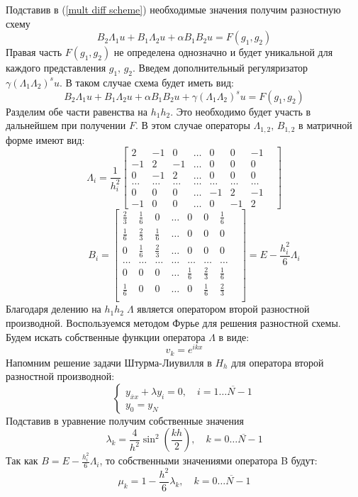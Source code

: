 \documentclass[oneside, final, 14pt]{article}
\begin{document}
Подставив в (\ref{mult diff scheme}) необходимые значения получим разностную схему
\begin{equation}
B_2 \Lambda_1 u + B_1 \Lambda_2 u + \alpha B_1 B_2 u = F(g_1,g_2)
\end{equation}
Правая часть $F(g_1,g_2)$ не определена однозначно и будет уникальной для каждого представления $g_1,\,g_2$.
Введем дополнительный регуляризатор $\gamma(\Lambda_1\Lambda_2)^s u$. В таком случае схема будет иметь вид:
\begin{equation}\label{scheme}
B_2 \Lambda_1 u + B_1 \Lambda_2 u + \alpha B_1 B_2 u +\gamma(\Lambda_1\Lambda_2)^s u = F(g_1,g_2)
\end{equation}
Разделим обе части равенства на $h_1h_2$. Это необходимо будет участь в дальнейшем при получении $F$.
В этом случае операторы $\Lambda_{1,2},\,B_{1,2}$ в матричной форме имеют вид:
$$\Lambda_i = \frac{1}{h_i^2}
\begin{bmatrix}
2 & -1 & 0 & \ldots & 0 & 0 & -1\\
-1 & 2 & -1 & \ldots & 0 & 0 & 0\\
0 & -1 & 2 & \ldots &0 & 0 & 0\\
\ldots & \ldots & \ldots & \ldots & \ldots & \ldots & \ldots &\\
0 & 0 & 0 & \ldots & -1 & 2 & -1\\
-1 & 0 & 0 & \ldots & 0 & -1 & 2
\end{bmatrix}
$$
$$
\qquad B_i = 
\begin{bmatrix}
\frac{2}{3} & \frac{1}{6} & 0 & \ldots & 0 & 0 & \frac{1}{6}\\
\frac{1}{6} & \frac{2}{3} & \frac{1}{6} & \ldots & 0 & 0 & 0\\
0 & \frac{1}{6} & \frac{2}{3} & \ldots &0 & 0 & 0\\
\ldots & \ldots & \ldots & \ldots & \ldots & \ldots & \ldots &\\
0 & 0 & 0 & \ldots & \frac{1}{6} & \frac{2}{3} & \frac{1}{6}\\
\frac{1}{6} & 0 & 0 & \ldots & 0 & \frac{1}{6} & \frac{2}{3} \\
\end{bmatrix} = E - \frac{h_i^2}{6}\Lambda_i$$
Благодаря делению на $h_1h_2\;\Lambda$ является оператором второй разностной производной.
Воспользуемся методом Фурье для решения разностной схемы. Будем искать собственные функции оператора $\Lambda$ в виде:
$$v_k = e^{ikx}$$
Напомним решение задачи Штурма-Лиувилля в $H_h$ для оператора второй разностной производной:
$$\begin{cases}
y_{\overline{x}x} + \lambda y_i = 0,\quad i = \overline{1\ldots N-1} \\
y_0 = y_N
\end{cases}$$
Подставив в уравнение получим собственные значения 
$$
\lambda_k = \frac{4}{h^2} \sin^2(\frac{kh}{2}),\quad k = \overline{0 \ldots N-1}
$$
Так как $B = E - \frac{h_i^2}{6}\Lambda_i$, то собственными значениями оператора B будут:
$$
\mu_k = 1 - \frac{h^2}{6}\lambda_k,\quad k = \overline{0 \ldots N-1}
$$
\end{document}
